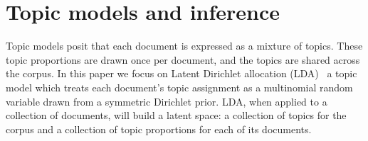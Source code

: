 \section{Topic models and inference}
\label{sec:models}




Topic models posit that each document is expressed as a mixture of
topics.  These topic proportions are drawn once per document, and the
topics are shared across the corpus.  In this paper we focus on Latent
Dirichlet allocation (LDA)~\cite{blei-03} a topic model which treats
each document's topic assignment as a multinomial random variable
drawn from a symmetric Dirichlet prior.  LDA, when applied to a
collection of documents, will build a latent space: a collection of
topics for the corpus and a collection of topic proportions for each
of its documents.  

